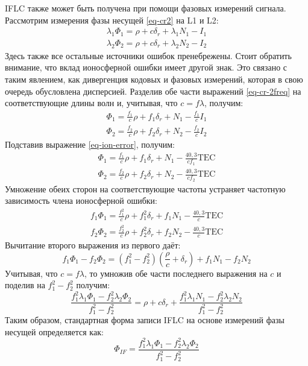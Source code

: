IFLC также может быть получена при помощи фазовых измерений сигнала.
Рассмотрим измерения фазы несущей \eqref{eq-cr2} на L1 и L2:
\begin{equation}
\label{eq-cr-2freq}
\begin{aligned}
\lambda_1\Phi_1=\rho+c\delta_r+\lambda_1N_1-I_1 \\
\lambda_2\Phi_2=\rho+c\delta_r+\lambda_2N_2-I_2   
\end{aligned}
\end{equation}
Здесь также все остальные источники ошибок пренебрежены. 
Стоит обратить внимание, что вклад ионосферной ошибки имеет другой знак.
Это связано с таким явлением, как дивергенция кодовых и фазовых измерений, которая в свою очередь обусловлена дисперсией. 
Разделив обе части выражений \eqref{eq-cr-2freq} на соответствующие длины волн и, учитывая, что $c=f\lambda$, получим:
\begin{equation}
\begin{aligned}
\Phi_1=\frac{f_1}{c}\rho+f_1\delta_r+N_1-\frac{f_1}{c}I_1 \\
\Phi_2=\frac{f_2}{c}\rho+f_2\delta_r+N_2-\frac{f_2}{c}I_2   
\end{aligned}
\end{equation}
Подставив выражение \eqref{eq-ion-error}, получим:
\begin{equation}
\begin{aligned}
\Phi_1=\frac{f_1}{c}\rho+f_1\delta_r+N_1-\frac{40,3}{cf_1}\text{TEC} \\
\Phi_2=\frac{f_2}{c}\rho+f_2\delta_r+N_2-\frac{40,3}{cf_2}\text{TEC}   
\end{aligned}
\end{equation}
Умножение обеих сторон на соответствующие частоты устраняет частотную зависимость члена ионосферной ошибки:
\begin{equation}
\begin{aligned}
f_1\Phi_1=\frac{f_1^2}{c}\rho+f_1^2\delta_r+f_1N_1-\frac{40,3}{c}\text{TEC} \\
f_2\Phi_2=\frac{f_2^2}{c}\rho+f_2^2\delta_r+f_2N_2-\frac{40,3}{c}\text{TEC}  
\end{aligned}
\end{equation}
Вычитание второго выражения из первого даёт:
\begin{equation}
f_1\Phi_1-f_2\Phi_2=(f_1^2-f_2^2)\left(\frac{\rho}{c}+\delta_r\right)+f_1N_1-f_2N_2    
\end{equation}
Учитывая, что $c=f\lambda$, то умножив обе части последнего выражения на $c$ и поделив на $f_1^2-f_2^2$ получим:
\begin{equation}
\frac{f_1^2\lambda_1\Phi_1-f_2^2\lambda_2\Phi_2}{f_1^2-f_2^2}=\rho+c\delta_r+\frac{f_1^2\lambda_1N_1-f_2^2\lambda_2N_2}{f_1^2-f_2^2}    
\end{equation}
Таким образом, стандартная форма записи IFLC на основе измерений фазы несущей определяется как:
\begin{equation}
\Phi_{IF}=\frac{f_1^2\lambda_1\Phi_1-f_2^2\lambda_2\Phi_2}{f_1^2-f_2^2}    
\end{equation} 

